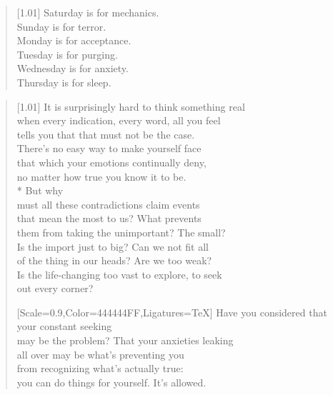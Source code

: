 \label{gender:surgery}
\null
\vfill
\begin{verse}[1.01\textwidth]
  Saturday is for mechanics.\\
  Sunday is for terror.\\
  Monday is for acceptance.\\
  Tuesday is for purging.\\
  Wednesday is for anxiety.\\
  Thursday is for sleep.
\end{verse}
\vfill

\newpage

\begin{verse}[1.01\textwidth]
  It is surprisingly hard to think something real\\
  when every indication, every word, all you feel\\
  tells you that that must not be the case.\\
  There's no easy way to make yourself face\\
  that which your emotions continually deny,\\
  no matter how true you know it to be.\\*
   But why\\
  must all these contradictions claim events\\
  that mean the most to us? What prevents\\
  them from taking the unimportant? The small?\\
  Is the import just to big? Can we not fit all\\
  of the thing in our heads? Are we too weak?\\
  Is the life-changing too vast to explore, to seek\\
  out every corner?

  {[Scale=0.9,Color=444444FF,Ligatures=TeX]
  \vin Have you considered that your constant seeking\\
  \vin may be the problem? That your anxieties leaking\\
  \vin all over may be what's preventing you\\
  \vin from recognizing what's actually true:\\
  \vin you can do things for yourself. It's allowed.}


\end{verse}
